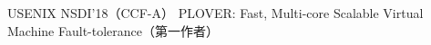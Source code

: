 \cvpub
{USENIX NSDI'18（CCF-A）} %
{PLOVER: Fast, Multi-core Scalable Virtual Machine Fault-tolerance（第一作者）} %
{} %
{} %
{ %
}
